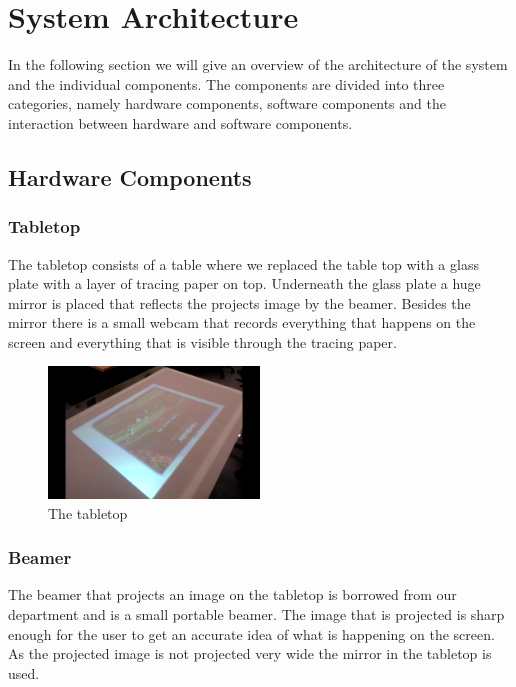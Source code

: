 \documentclass[a4paper,10pt]{article}
\begin{document}
\section{System Architecture}
\label{sec:system-architecture}
In the following section we will give an overview of the architecture of the system and the individual components.
The components are divided into three categories, namely hardware components, software components and the interaction between hardware and software components.

	\subsection{Hardware Components}
	\subsubsection{Tabletop}
	The tabletop consists of a table where we replaced the table top with a glass plate with a layer of tracing paper on top.
	Underneath the glass plate a huge mirror is placed that reflects the projects image by the beamer. 
	Besides the mirror there is a small webcam that records everything that happens on the screen and everything that is visible through the tracing paper. 

	\begin{figure}[h!]
	\caption{The tabletop}
	\centering
	\includegraphics[width=0.5\textwidth]{images/tabletop}
	\end{figure}

	\subsubsection{Beamer}
	The beamer that projects an image on the tabletop is borrowed from our department and is a small portable beamer.
	The image that is projected is sharp enough for the user to get an accurate idea of what is happening on the screen. 
	As the projected image is not projected very wide the mirror in the tabletop is used. 
\end{document}
